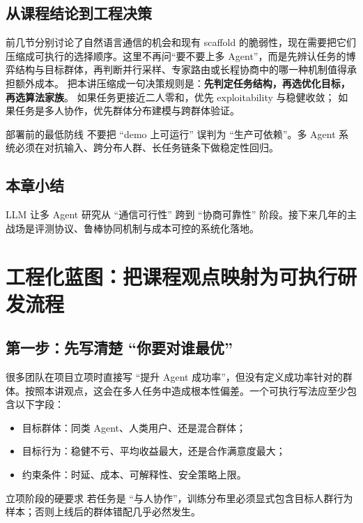 \documentclass[a4paper]{article}
\begin{document}
\subsection{从课程结论到工程决策}
前几节分别讨论了自然语言通信的机会和现有 scaffold 的脆弱性，现在需要把它们压缩成可执行的选择顺序。这里不再问“要不要上多 Agent”，而是先辨认任务的博弈结构与目标群体，再判断并行采样、专家路由或长程协商中的哪一种机制值得承担额外成本。
把本讲压缩成一句决策规则是：\textbf{先判定任务结构，再选优化目标，再选算法家族}。
如果任务更接近二人零和，优先 exploitability 与稳健收敛；
如果任务是多人协作，优先群体分布建模与跨群体验证。

\begin{warningbox}{部署前的最低防线}
不要把 ``demo 上可运行'' 误判为 ``生产可依赖''。多 Agent 系统必须在对抗输入、跨分布人群、长任务链条下做稳定性回归。
\end{warningbox}

\subsection{本章小结}
LLM 让多 Agent 研究从 ``通信可行性'' 跨到 ``协商可靠性'' 阶段。接下来几年的主战场是评测协议、鲁棒协同机制与成本可控的系统化落地。

\section{工程化蓝图：把课程观点映射为可执行研发流程}

\subsection{第一步：先写清楚 ``你要对谁最优''}
很多团队在项目立项时直接写 ``提升 Agent 成功率''，但没有定义成功率针对的群体。按照本讲观点，这会在多人任务中造成根本性偏差。一个可执行写法应至少包含以下字段：
\begin{itemize}
    \item 目标群体：同类 Agent、人类用户、还是混合群体；
    \item 目标行为：稳健不亏、平均收益最大，还是合作满意度最大；
    \item 约束条件：时延、成本、可解释性、安全策略上限。
\end{itemize}

\begin{importantbox}{立项阶段的硬要求}
若任务是 ``与人协作''，训练分布里必须显式包含目标人群行为样本；否则上线后的群体错配几乎必然发生。
\end{importantbox}
\end{document}
